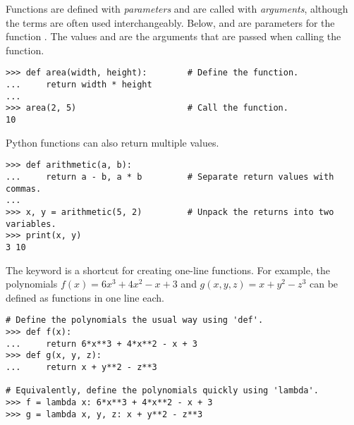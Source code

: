 Functions are defined with \emph{parameters} and are called with \emph{arguments}, although the terms are often used interchangeably.
Below,  and  are parameters for the function .
The values  and  are the arguments that are passed when calling the function.

\begin{lstlisting}
>>> def area(width, height):        # Define the function.
...     return width * height
...
>>> area(2, 5)                      # Call the function.
10
\end{lstlisting}

Python functions can also return multiple values.

\begin{lstlisting}
>>> def arithmetic(a, b):
...     return a - b, a * b         # Separate return values with commas.
...
>>> x, y = arithmetic(5, 2)         # Unpack the returns into two variables.
>>> print(x, y)
3 10
\end{lstlisting}

The keyword  is a shortcut for creating one-line functions.
For example, the polynomials $f(x) = 6x^3 + 4x^2 - x + 3$ and $g(x,y,z) = x + y^2 - z^3$ can be defined as functions in one line each.

\begin{lstlisting}
# Define the polynomials the usual way using 'def'.
>>> def f(x):
...     return 6*x**3 + 4*x**2 - x + 3
>>> def g(x, y, z):
...     return x + y**2 - z**3

# Equivalently, define the polynomials quickly using 'lambda'.
>>> f = lambda x: 6*x**3 + 4*x**2 - x + 3
>>> g = lambda x, y, z: x + y**2 - z**3
\end{lstlisting}

